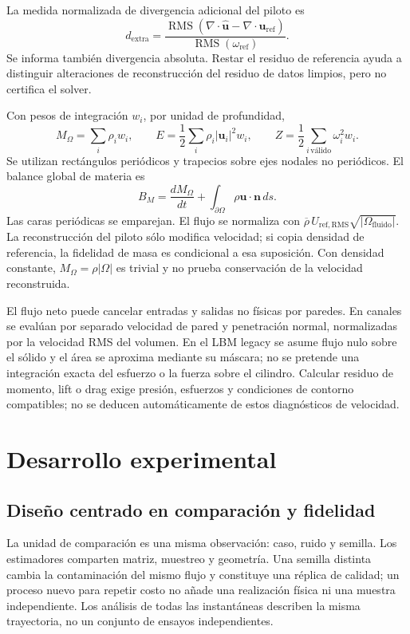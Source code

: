 \documentclass[11pt,oneside,openany]{book}
\DeclareMathOperator{\RMS}{RMS}
\begin{document}
La medida normalizada de divergencia adicional del piloto es
\begin{equation}
 d_{\mathrm{extra}}=
 \frac{\RMS(\nabla\cdot\widehat{\boldsymbol u}
              -\nabla\cdot\boldsymbol u_{\mathrm{ref}})}
      {\RMS(\omega_{\mathrm{ref}})}.
\end{equation}
Se informa también divergencia absoluta. Restar el residuo de referencia
ayuda a distinguir alteraciones de reconstrucción del residuo de datos
limpios, pero no certifica el solver.

Con pesos de integración $w_i$, por unidad de profundidad,
\begin{equation}
 M_\Omega=\sum_i\rho_iw_i,\qquad
 E=\frac12\sum_i\rho_i|\boldsymbol u_i|^2w_i,\qquad
 Z=\frac12\sum_{i\,\text{válido}}\omega_i^2w_i.
\end{equation}
Se utilizan rectángulos periódicos y trapecios sobre ejes nodales no
periódicos. El balance global de materia es
\begin{equation}
 B_M=\frac{dM_\Omega}{dt}+
        \int_{\partial\Omega}\rho\boldsymbol u\cdot\boldsymbol n\,ds.
\end{equation}
Las caras periódicas se emparejan. El flujo se normaliza con
$\overline\rho\,U_{\mathrm{ref,RMS}}\sqrt{|\Omega_{\mathrm{fluido}}|}$.
La reconstrucción del piloto sólo modifica velocidad; si copia densidad
de referencia, la fidelidad de masa es condicional a esa suposición.
Con densidad constante, $M_\Omega=\rho|\Omega|$ es trivial y no prueba
conservación de la velocidad reconstruida.

El flujo neto puede cancelar entradas y salidas no físicas por paredes.
En canales se evalúan por separado velocidad de pared y penetración
normal, normalizadas por la velocidad RMS del volumen. En el LBM legacy
se asume flujo nulo sobre el sólido y el área se aproxima mediante su
máscara; no se pretende una integración exacta del esfuerzo o la fuerza
sobre el cilindro. Calcular residuo de momento, lift o drag exige presión,
esfuerzos y condiciones de contorno compatibles; no se deducen
automáticamente de estos diagnósticos de velocidad.

\chapter{Desarrollo experimental}
\section{Diseño centrado en comparación y fidelidad}
La unidad de comparación es una misma observación: caso, ruido y semilla.
Los estimadores comparten matriz, muestreo y geometría. Una semilla distinta
cambia la contaminación del mismo flujo y constituye una réplica de calidad;
un proceso nuevo para repetir costo no añade una realización física ni una
muestra independiente. Los análisis de todas las instantáneas describen la
misma trayectoria, no un conjunto de ensayos independientes.
\end{document}
